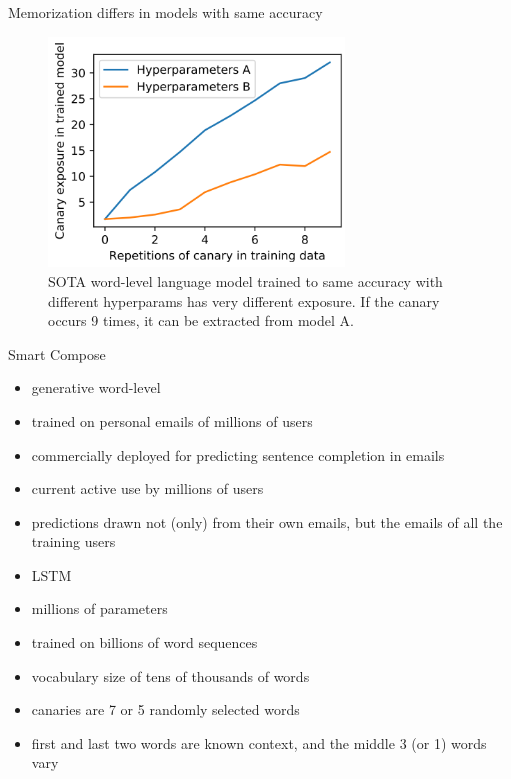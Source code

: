 \documentclass{beamer}
\begin{document}
\begin{frame}{Memorization differs in models with same accuracy}

\begin{figure}[h]
\includegraphics[width=0.7\textwidth]{img/fig1}
\caption{SOTA word-level language model trained to same accuracy with different hyperparams has very different exposure. If the canary occurs 9 times, it can be extracted from model A.}
\end{figure}

\end{frame}
\begin{frame}{Smart Compose}

\begin{itemize}
\item generative word-level
\item trained on personal emails of millions of users
\item commercially deployed for predicting sentence completion in emails
\item current active use by millions of users
\item predictions drawn not (only) from their own emails, but the emails of all the training users
\item LSTM
\item millions of parameters
\item trained on billions of word sequences 
\item vocabulary size of tens of thousands of words
\item canaries are 7 or 5 randomly selected words
\item first and last two words are known context, and the middle 3 (or 1) words vary
\end{itemize}

\end{frame}
\end{document}
